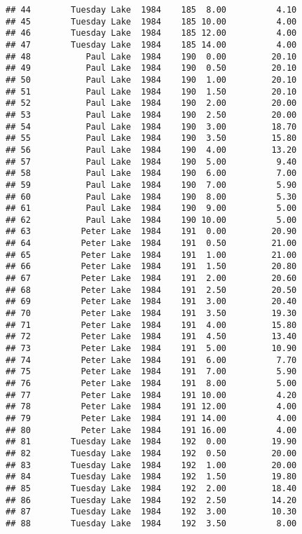 \documentclass[
]{article}
\begin{document}
\begin{verbatim}
## 44        Tuesday Lake  1984    185  8.00          4.10
## 45        Tuesday Lake  1984    185 10.00          4.00
## 46        Tuesday Lake  1984    185 12.00          4.00
## 47        Tuesday Lake  1984    185 14.00          4.00
## 48           Paul Lake  1984    190  0.00         20.10
## 49           Paul Lake  1984    190  0.50         20.10
## 50           Paul Lake  1984    190  1.00         20.10
## 51           Paul Lake  1984    190  1.50         20.10
## 52           Paul Lake  1984    190  2.00         20.00
## 53           Paul Lake  1984    190  2.50         20.00
## 54           Paul Lake  1984    190  3.00         18.70
## 55           Paul Lake  1984    190  3.50         15.80
## 56           Paul Lake  1984    190  4.00         13.20
## 57           Paul Lake  1984    190  5.00          9.40
## 58           Paul Lake  1984    190  6.00          7.00
## 59           Paul Lake  1984    190  7.00          5.90
## 60           Paul Lake  1984    190  8.00          5.30
## 61           Paul Lake  1984    190  9.00          5.00
## 62           Paul Lake  1984    190 10.00          5.00
## 63          Peter Lake  1984    191  0.00         20.90
## 64          Peter Lake  1984    191  0.50         21.00
## 65          Peter Lake  1984    191  1.00         21.00
## 66          Peter Lake  1984    191  1.50         20.80
## 67          Peter Lake  1984    191  2.00         20.60
## 68          Peter Lake  1984    191  2.50         20.50
## 69          Peter Lake  1984    191  3.00         20.40
## 70          Peter Lake  1984    191  3.50         19.30
## 71          Peter Lake  1984    191  4.00         15.80
## 72          Peter Lake  1984    191  4.50         13.40
## 73          Peter Lake  1984    191  5.00         10.90
## 74          Peter Lake  1984    191  6.00          7.70
## 75          Peter Lake  1984    191  7.00          5.90
## 76          Peter Lake  1984    191  8.00          5.00
## 77          Peter Lake  1984    191 10.00          4.20
## 78          Peter Lake  1984    191 12.00          4.00
## 79          Peter Lake  1984    191 14.00          4.00
## 80          Peter Lake  1984    191 16.00          4.00
## 81        Tuesday Lake  1984    192  0.00         19.90
## 82        Tuesday Lake  1984    192  0.50         20.00
## 83        Tuesday Lake  1984    192  1.00         20.00
## 84        Tuesday Lake  1984    192  1.50         19.80
## 85        Tuesday Lake  1984    192  2.00         18.40
## 86        Tuesday Lake  1984    192  2.50         14.20
## 87        Tuesday Lake  1984    192  3.00         10.30
## 88        Tuesday Lake  1984    192  3.50          8.00

\end{verbatim}
\end{document}
